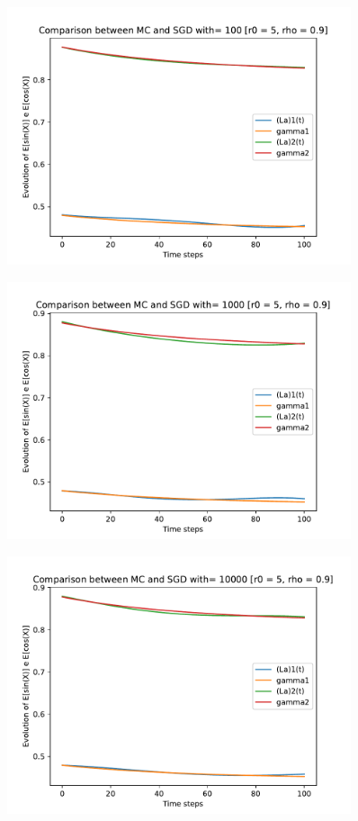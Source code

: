 \documentclass[a4paper,11pt,openright]{report}
\begin{document}
\begin{figure}[H]
\centering
\includegraphics[width=0.9\textwidth]{images/graphics T = 1/n = 4, M = 100 sine and cosine.pdf}
\end{figure}
\begin{figure}[H]
\centering
\includegraphics[width=0.9\textwidth]{images/graphics T = 1/n = 4, M = 1000 sine and cosine.pdf}
\end{figure}
\begin{figure}[H]
\centering
\includegraphics[width=0.9\textwidth]{images/graphics T = 1/n = 4, M = 10000 sine and cosine.pdf}
\end{figure}
\newpage
\end{document}

